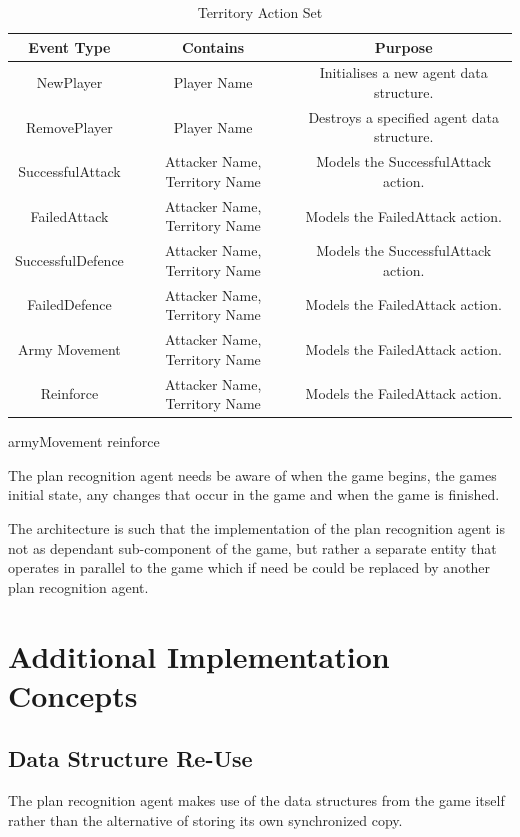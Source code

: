 \documentclass[parskip]{cs4rep}
\begin{document}
\begin{table}[ht]
\centering
\begin{tabular}{|c|c|c|}
\hline 
\textbf{Event Type} & \textbf{Contains} & \textbf{Purpose} \\ 
\hline 
NewPlayer & Player Name & Initialises a new agent data structure. \\ 
\hline 
RemovePlayer & Player Name & Destroys a specified agent data structure. \\ 
\hline 
SuccessfulAttack & Attacker Name, Territory Name & Models the SuccessfulAttack action. \\ 
\hline
FailedAttack & Attacker Name, Territory Name & Models the FailedAttack action. \\ 
\hline
SuccessfulDefence & Attacker Name, Territory Name & Models the SuccessfulAttack action. \\ 
\hline
FailedDefence & Attacker Name, Territory Name & Models the FailedAttack action. \\ 
\hline
Army Movement & Attacker Name, Territory Name & Models the FailedAttack action. \\ 
\hline
Reinforce & Attacker Name, Territory Name & Models the FailedAttack action. \\ 
\hline
\end{tabular}
\caption{Territory Action Set}
\label{table:event-description}
\end{table}

armyMovement
reinforce

The plan recognition agent needs be aware of when the game begins, the games initial state, any changes that occur in the game and when the game is finished.

The architecture is such that the implementation of the plan recognition agent is not as dependant sub-component of the game, but rather a separate entity that operates in parallel to the game which if need be could be replaced by another plan recognition agent.

\section{Additional Implementation Concepts}

\subsection{Data Structure Re-Use}

The plan recognition agent makes use of the data structures from the game itself rather than the alternative of storing its own synchronized copy.
\end{document}
